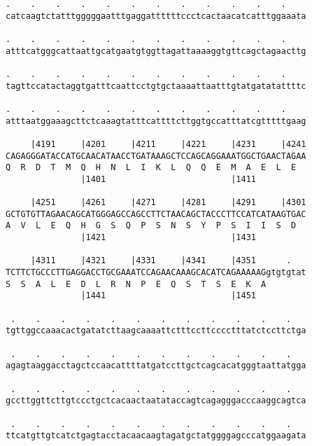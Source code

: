 \documentclass{article}
\begin{document}
\begin{Verbatim}
.    .    .    .    .    .    .    .    .    .    .    .    
catcaagtctatttgggggaatttgaggattttttccctcactaacatcatttggaaata
                                                            
.    .    .    .    .    .    .    .    .    .    .    .    
atttcatgggcattaattgcatgaatgtggttagattaaaaggtgttcagctagaacttg
                                                            
.    .    .    .    .    .    .    .    .    .    .    .    
tagttccatactaggtgatttcaattcctgtgctaaaattaatttgtatgatatattttc
                                                            
.    .    .    .    .    .    .    .    .    .    .    .    
atttaatggaaagcttctcaaagtatttcattttcttggtgccatttatcgtttttgaag
                                                            
     |4191     |4201     |4211     |4221     |4231     |4241
CAGAGGGATACCATGCAACATAACCTGATAAAGCTCCAGCAGGAAATGGCTGAACTAGAA
Q  R  D  T  M  Q  H  N  L  I  K  L  Q  Q  E  M  A  E  L  E  
               |1401                         |1411          
  
     |4251     |4261     |4271     |4281     |4291     |4301
GCTGTGTTAGAACAGCATGGGAGCCAGCCTTCTAACAGCTACCCTTCCATCATAAGTGAC
A  V  L  E  Q  H  G  S  Q  P  S  N  S  Y  P  S  I  I  S  D  
               |1421                         |1431          
  
     |4311     |4321     |4331     |4341     |4351      .   
TCTTCTGCCCTTGAGGACCTGCGAAATCCAGAACAAAGCACATCAGAAAAAGgtgtgtat
S  S  A  L  E  D  L  R  N  P  E  Q  S  T  S  E  K  A        
               |1441                         |1451          
  
 .    .    .    .    .    .    .    .    .    .    .    .   
tgttggccaaacactgatatcttaagcaaaattctttccttcccctttatctccttctga
                                                            
 .    .    .    .    .    .    .    .    .    .    .    .   
agagtaaggacctagctccaacattttatgatccttgctcagcacatgggtaattatgga
                                                            
 .    .    .    .    .    .    .    .    .    .    .    .   
gccttggttcttgtccctgctcacaactaatataccagtcagagggacccaaggcagtca
                                                            
 .    .    .    .    .    .    .    .    .    .    .    .   
ttcatgttgtcatctgagtacctacaacaagtagatgctatggggagcccatggaagata
                                                            

\end{Verbatim}
\end{document}
